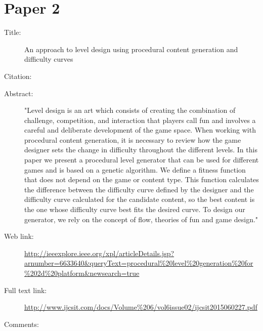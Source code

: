 \documentclass{scrartcl}
\begin{document}
\section*{Paper 2}
\begin{description}
\item[Title:] An approach to level design using procedural content generation and difficulty curves
\item[Citation:] \cite{bibtex_key}
\item[Abstract:] "Level design is an art which consists of creating the combination of challenge, competition, and interaction that players call fun and involves a careful and deliberate development of the game space. When working with procedural content generation, it is necessary to review how the game designer sets the change in difficulty throughout the different levels. In this paper we present a procedural level generator that can be used for different games and is based on a genetic algorithm. We define a fitness function that does not depend on the game or content type. This function calculates the difference between the difficulty curve defined by the designer and the difficulty curve calculated for the candidate content, so the best content is the one whose difficulty curve best fits the desired curve. To design our generator, we rely on the concept of flow, theories of fun and game design."
\item[Web link:] \url{http://ieeexplore.ieee.org/xpl/articleDetails.jsp?arnumber=6633640&queryText=procedural%20level%20generation%20for%202d%20platform&newsearch=true}
\item[Full text link:] \url{http://www.ijcsit.com/docs/Volume%206/vol6issue02/ijcsit2015060227.pdf}
\item[Comments:] 
\end{description}
\end{document}
